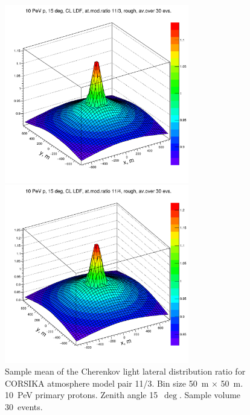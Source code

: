 \documentclass[final,5p,times,twocolumn]{elsarticle}
\begin{document}
\begin{figure}[tb]
 \begin{minipage}[t]{0.48\textwidth}
    \centering
    \includegraphics[width=19pc]{11d3}%
    \vspace{-1.0pc}
    \caption{Sample mean of the Cherenkov light lateral distribution ratio for CORSIKA atmosphere model pair 11/3. Bin size 50~m $\times$ 50~m. 10~PeV primary protons. Zenith angle 15~$\deg$. Sample volume 30~events.}
\label{fig:3d11}
\end{minipage}
\hfill
\begin{minipage}[t]{0.48\textwidth}
    \centering
    \includegraphics[width=19pc]{11d4}%

\end{minipage}
\end{figure}
\end{document}
